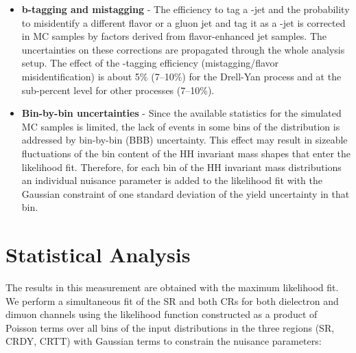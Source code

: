 \begin{itemize}
\item{\bfseries b-tagging and mistagging} - The efficiency to tag a \Pqb-jet and the
  probability to misidentify a different flavor or a gluon jet and tag it as a
  \Pqb-jet is corrected in MC samples by factors derived from
  flavor-enhanced jet samples. The uncertainties on these corrections
  are propagated through the whole analysis setup. The effect of the
  \Pqb-tagging efficiency (mistagging/flavor misidentification) is about 5\% (7--10\%) for the Drell-Yan process and at the sub-percent level for other processes (7--10\%).

\item{\bfseries Bin-by-bin uncertainties} - Since the available statistics for the simulated MC samples is limited, the lack of events in some bins of the \mTHH distribution is addressed by bin-by-bin (BBB) uncertainty. This effect may result in sizeable fluctuations of the bin content of the HH invariant mass shapes that enter the
  likelihood fit. Therefore, for each bin of the HH invariant mass distributions
  an individual nuisance parameter is added to the likelihood fit with the Gaussian constraint of one standard deviation of
  the yield uncertainty in that bin.
  
\end{itemize}





\section{Statistical Analysis}
\label{sec:statistics}


The results in this measurement are obtained with the maximum likelihood fit. We perform a simultaneous fit of the SR and both CRs for both dielectron and dimuon channels using the likelihood function constructed as a product
of Poisson terms over all bins of the input \mTHH distributions in the three regions (SR, CRDY, CRTT) with Gaussian terms to constrain the nuisance parameters:

